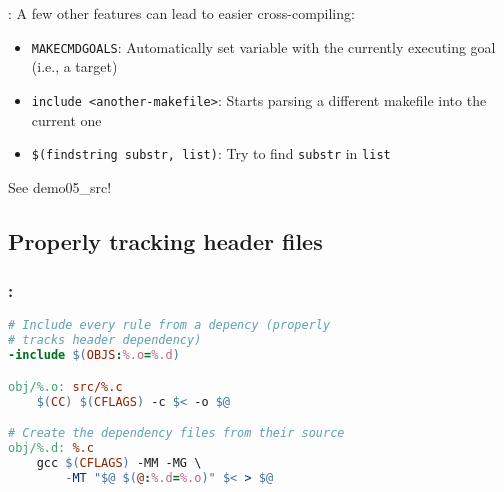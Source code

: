 \begin{frame}{\secname: \small\subsecname\normalsize}
    A few other features can lead to easier cross-compiling:

    \begin{itemize}
        \item \texttt{MAKECMDGOALS}: Automatically set variable with the currently executing goal (i.e., a target)
        \item \texttt{include <another-makefile>}: Starts parsing a different makefile into the current one
        \item \texttt{\$(findstring substr, list)}: Try to find \texttt{substr} in \texttt{list}
    \end{itemize}

    See demo05\_src!
\end{frame}

\subsection{Properly tracking header files}
\begin{frame}[fragile]
    \frametitle{\secname: \small\subsecname\normalsize}

    \begin{lstlisting}[language=make]
# Include every rule from a depency (properly
# tracks header dependency)
-include $(OBJS:%.o=%.d)

obj/%.o: src/%.c
    $(CC) $(CFLAGS) -c $< -o $@

# Create the dependency files from their source
obj/%.d: %.c
    gcc $(CFLAGS) -MM -MG \
        -MT "$@ $(@:%.d=%.o)" $< > $@
    \end{lstlisting}

\end{frame}
